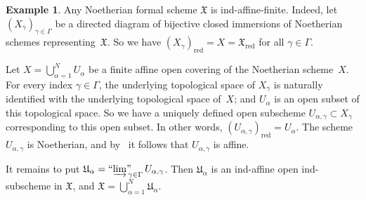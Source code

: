 \documentclass[12pt,a4paper]{amsart}
\newcommand{\+}{\protect\nobreakdash-}
\renewcommand{\:}{\colon}
\newcommand{\red}{\mathrm{red}}
\newcommand{\ilim}
 {\mathop{\text{\normalfont``$\varinjlim$''\!\!}}\nolimits}
\newcommand{\fX}{\mathfrak X}
\newcommand{\fU}{\mathfrak U}
\theoremstyle{plain}
\theoremstyle{definition}
\newtheorem{ex}[thm]{Example}
\begin{document}
\begin{ex} \label{Noetherian-formal-schemes-are-ind-affine-finite-ex}
 Any Noetherian formal scheme $\fX$ is ind-affine-finite.
 Indeed, let $(X_\gamma)_{\gamma\in\Gamma}$ be a directed diagram of
bijective closed immersions of Noetherian schemes representing~$\fX$.
 So we have $(X_\gamma)_\red=X=\fX_\red$ for all $\gamma\in\Gamma$.

 Let $X=\bigcup_{\alpha=1}^N U_\alpha$ be a finite affine open
covering of the Noetherian scheme~$X$.
 For every index $\gamma\in\Gamma$, the underlying topological space
of $X_\gamma$ is naturally identified with the underlying
topological space of~$X$; and $U_\alpha$ is an open subset of
this topological space.
 So we have a uniquely defined open subscheme $U_{\alpha,\gamma}\subset
X_\gamma$ corresponding to this open subset.
 In other words, $(U_{\alpha,\gamma})_\red=U_\alpha$.
 The scheme $U_{\alpha,\gamma}$ is Noetherian, and
by~\cite[Lemma Tag~01YQ]{SP} it follows that $U_{\alpha,\gamma}$
is affine.

 It remains to put
$\fU_\alpha=\ilim_{\gamma\in\Gamma}U_{\alpha,\gamma}$.
 Then $\fU_\alpha$ is an ind-affine open ind-subscheme in $\fX$,
and $\fX=\bigcup_{\alpha=1}^N\fU_\alpha$.
\end{ex}
\end{document}

